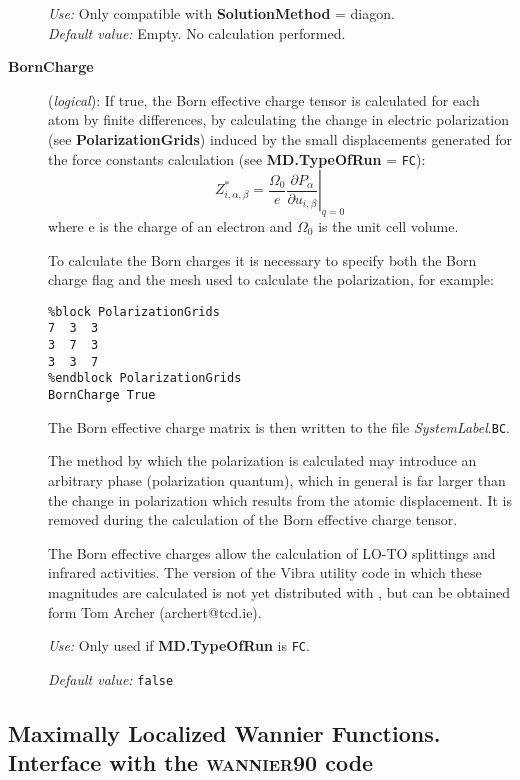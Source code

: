 \begin{description}
\textit{Use:} Only compatible with \textbf{SolutionMethod} = diagon.\\
\textit{Default value:} Empty. No calculation performed.

\item[\textbf{BornCharge}] (\textit{logical}):
If true, the Born effective charge tensor is calculated for each atom
by finite differences, by calculating the change in electric polarization
(see \textbf{PolarizationGrids}) induced by the small displacements generated
for the force constants calculation (see \textbf{MD.TypeOfRun} = \texttt{FC}):
\begin{equation}\label {eq:effective_charge}
Z^*_{i,\alpha,\beta}=\frac{\Omega_0}{e} \left. {\frac{\partial{P_\alpha}}
{\partial{u_{i,\beta}}}}\right|_{q=0}
\end{equation}
where e is the charge of an electron and $\Omega_0$ is the unit cell volume.

To calculate the Born charges it is necessary to specify both the Born
charge flag and the mesh used to calculate the polarization, for example:
\begin{verbatim}
%block PolarizationGrids
7  3  3
3  7  3
3  3  7
%endblock PolarizationGrids
BornCharge True
\end{verbatim}

The Born effective charge matrix is then written to the file
\textit{SystemLabel}.\texttt{BC}.

The method by which the polarization is calculated may introduce an arbitrary
phase (polarization quantum), which in general is far larger than the change
in polarization which results from the atomic displacement. It is removed
during the calculation of the Born effective charge tensor.

The Born effective charges allow the calculation of LO-TO splittings and
infrared activities. The version of the Vibra utility code in which these
magnitudes are calculated is not yet distributed with \siesta, but can be
obtained form Tom Archer (archert@tcd.ie).

\textit{Use:} Only used if \textbf{MD.TypeOfRun} is \texttt{FC}.

\textit{Default value:} \texttt{false}

\end{description}

\subsection[Maximally Localized Wannier Functions]%
{Maximally Localized Wannier Functions. \\
    Interface with the \textsc{wannier90} code}

